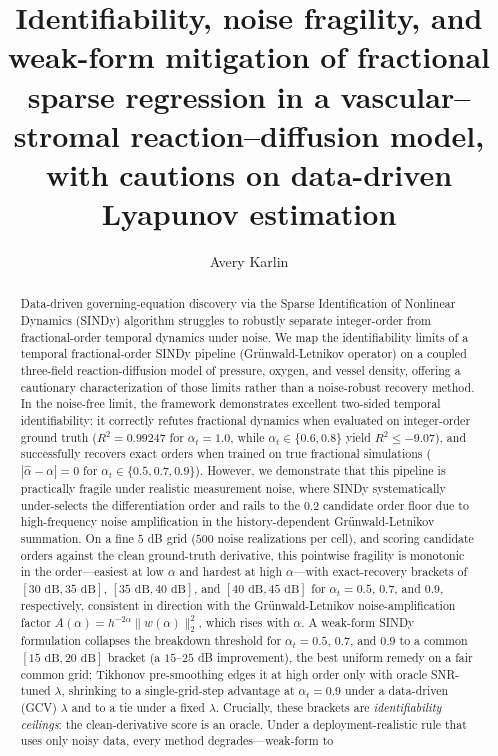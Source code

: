 \documentclass[review,3p,times]{elsarticle}
\begin{document}
\begin{frontmatter}

\title{Identifiability, noise fragility, and weak-form mitigation of fractional sparse regression in a vascular--stromal reaction--diffusion model, with cautions on data-driven Lyapunov estimation}

\author[col,cub]{Avery Karlin}
\address[col]{Department of Applied Physics and Applied Mathematics, Columbia University, New York, NY, USA}
\address[cub]{Department of Computer Science, University of Colorado Boulder, Boulder, CO, USA}

\begin{abstract}
Data-driven governing-equation discovery via the Sparse Identification of Nonlinear Dynamics (SINDy) algorithm struggles to robustly separate integer-order from fractional-order temporal dynamics under noise. We map the identifiability limits of a temporal fractional-order SINDy pipeline (Gr\"unwald-Letnikov operator) on a coupled three-field reaction-diffusion model of pressure, oxygen, and vessel density, offering a cautionary characterization of those limits rather than a noise-robust recovery method. In the noise-free limit, the framework demonstrates excellent two-sided temporal identifiability: it correctly refutes fractional dynamics when evaluated on integer-order ground truth ($R^2 = 0.99247$ for $\alpha_t = 1.0$, while $\alpha_t \in \{0.6, 0.8\}$ yield $R^2 \le -9.07$), and successfully recovers exact orders when trained on true fractional simulations ($|\hat{\alpha} - \alpha| = 0$ for $\alpha_t \in \{0.5, 0.7, 0.9\}$). However, we demonstrate that this pipeline is practically fragile under realistic measurement noise, where SINDy systematically under-selects the differentiation order and rails to the 0.2 candidate order floor due to high-frequency noise amplification in the history-dependent Gr\"unwald-Letnikov summation. On a fine $5$ dB grid ($500$ noise realizations per cell), and scoring candidate orders against the clean ground-truth derivative, this pointwise fragility is monotonic in the order---easiest at low $\alpha$ and hardest at high $\alpha$---with exact-recovery brackets of $[30\text{ dB}, 35\text{ dB}]$, $[35\text{ dB}, 40\text{ dB}]$, and $[40\text{ dB}, 45\text{ dB}]$ for $\alpha_t = 0.5$, $0.7$, and $0.9$, respectively, consistent in direction with the Gr\"unwald-Letnikov noise-amplification factor $A(\alpha) = h^{-2\alpha}\|w(\alpha)\|_2^2$, which rises with $\alpha$. A weak-form SINDy formulation collapses the breakdown threshold for $\alpha_t = 0.5$, $0.7$, and $0.9$ to a common $[15\text{ dB}, 20\text{ dB}]$ bracket (a $15$--$25$ dB improvement), the best uniform remedy on a fair common grid; Tikhonov pre-smoothing edges it at high order only with oracle SNR-tuned $\lambda$, shrinking to a single-grid-step advantage at $\alpha_t = 0.9$ under a data-driven (GCV) $\lambda$ and to a tie under a fixed $\lambda$. Crucially, these brackets are \emph{identifiability ceilings}: the clean-derivative score is an oracle. Under a deployment-realistic rule that uses only noisy data, every method degrades---weak-form to 
\end{abstract}
\end{frontmatter}
\end{document}
